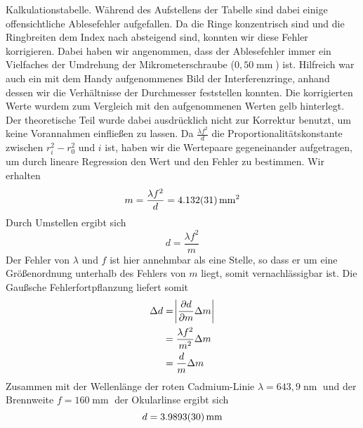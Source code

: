 \documentclass[a4paper,german,12pt,smallheadings]{scrartcl}
\begin{document}
Kalkulationstabelle. Während des Aufstellens der Tabelle sind dabei einige
offensichtliche Ablesefehler aufgefallen. Da die Ringe konzentrisch sind und
die Ringbreiten dem Index nach absteigend sind, konnten wir diese Fehler
korrigieren. Dabei haben wir angenommen, dass der Ablesefehler immer ein
Vielfaches der Umdrehung der Mikrometerschraube ($0{,}50 \operatorname{mm}$)
ist. Hilfreich war auch ein mit dem Handy aufgenommenes Bild der
Interferenzringe, anhand dessen wir die Verhältnisse der Durchmesser feststellen
konnten. Die korrigierten Werte wurdem zum Vergleich mit den aufgenommenen
Werten gelb hinterlegt. Der theoretische Teil wurde dabei ausdrücklich nicht
zur Korrektur benutzt, um keine Vorannahmen einfließen zu lassen.
Da $\frac{\lambda f^2}{d}$ die Proportionalitätskonstante zwischen
$r_i^2 - r_0^2$ und $i$ ist, haben wir die Wertepaare gegeneinander aufgetragen,
um durch lineare Regression den Wert und den Fehler zu bestimmen.
Wir erhalten
\begin{equation}
m = \frac{\lambda f^2}{d} = \num{4.132\pm0.031} \operatorname{mm}^2
\end{equation}
Durch Umstellen ergibt sich
\begin{equation}
d = \frac{\lambda f^2}{m}
\end{equation}
Der Fehler von $\lambda$ und $f$ ist hier annehmbar als eine Stelle, so dass er
um eine Größenordnung unterhalb des Fehlers von $m$ liegt, somit
vernachlässigbar ist. Die Gaußsche Fehlerfortpflanzung liefert somit
\begin{align*}
\Delta d &= \envert{\frac{\partial d}{\partial m} \Delta m} \\
&= \frac{\lambda f^2}{m^2} \Delta m \\
&= \frac{d}{m} \Delta m
\end{align*}
Zusammen mit der Wellenlänge der roten Cadmium-Linie $\lambda = 643{,}9
\operatorname{nm}$ und der Brennweite $f = 160 \operatorname{mm}$ der
Okularlinse ergibt sich
\begin{equation}
d = \num{3.9893+-0.0030} \operatorname{mm}
\end{equation}
\end{document}
